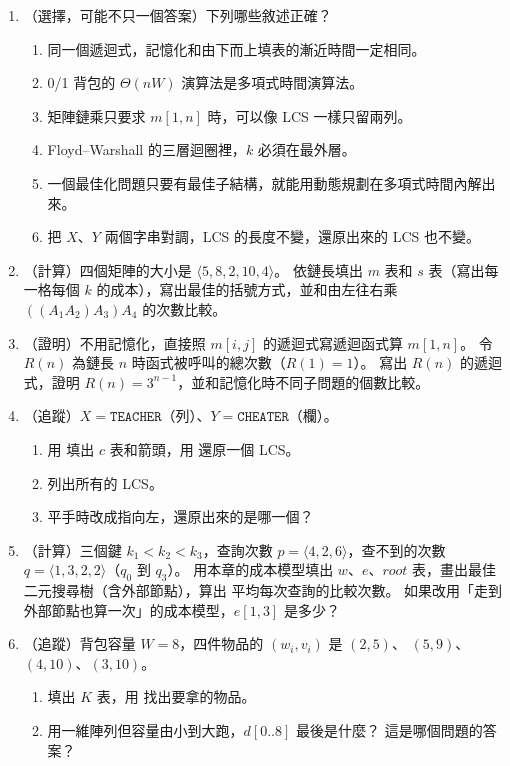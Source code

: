 \begin{enumerate}
\item \label{dp-q-tf}（選擇，可能不只一個答案）下列哪些敘述正確？
\begin{enumerate}
\item 同一個遞迴式，記憶化和由下而上填表的漸近時間一定相同。
\item 0/1 背包的 $\Theta(nW)$ 演算法是多項式時間演算法。
\item 矩陣鏈乘只要求 $m[1, n]$ 時，可以像 LCS 一樣只留兩列。
\item Floyd--Warshall 的三層迴圈裡，$k$ 必須在最外層。
\item 一個最佳化問題只要有最佳子結構，就能用動態規劃在多項式時間內解出來。
\item 把 $X$、$Y$ 兩個字串對調，LCS 的長度不變，還原出來的 LCS 也不變。
\end{enumerate}

\item \label{dp-q-mc}（計算）四個矩陣的大小是 $\langle 5, 8, 2, 10, 4 \rangle$。 依鏈長填出
$m$ 表和 $s$ 表（寫出每一格每個 $k$ 的成本），寫出最佳的括號方式，並和由左往右乘
$((A_1 A_2) A_3) A_4$ 的次數比較。

\item \label{dp-q-mc-rec}（證明）不用記憶化，直接照 $m[i, j]$ 的遞迴式寫遞迴函式算
$m[1, n]$。 令 $R(n)$ 為鏈長 $n$ 時函式被呼叫的總次數（$R(1) = 1$）。 寫出 $R(n)$ 的遞迴
式，證明 $R(n) = 3^{n-1}$，並和記憶化時不同子問題的個數比較。

\item \label{dp-q-lcs}（追蹤）$X = \texttt{TEACHER}$（列）、$Y = \texttt{CHEATER}$（欄）。
\begin{enumerate}
\item 用  填出 $c$ 表和箭頭，用  還原一個 LCS。
\item 列出所有的 LCS。
\item 平手時改成指向左，還原出來的是哪一個？
\end{enumerate}

\item \label{dp-q-obst}（計算）三個鍵 $k_1 < k_2 < k_3$，查詢次數
$p = \langle 4, 2, 6 \rangle$，查不到的次數 $q = \langle 1, 3, 2, 2 \rangle$（$q_0$ 到 $q_3$）。
用本章的成本模型填出 $w$、$e$、$\mathit{root}$ 表，畫出最佳二元搜尋樹（含外部節點），算出
平均每次查詢的比較次數。 如果改用「走到外部節點也算一次」的成本模型，$e[1, 3]$ 是多少？

\item \label{dp-q-ks}（追蹤）背包容量 $W = 8$，四件物品的 $(w_i, v_i)$ 是 $(2, 5)$、
$(5, 9)$、$(4, 10)$、$(3, 10)$。
\begin{enumerate}
\item 填出 $K$ 表，用  找出要拿的物品。
\item 用一維陣列但容量由小到大跑，$d[0..8]$ 最後是什麼？ 這是哪個問題的答案？
\end{enumerate}


\end{enumerate}
